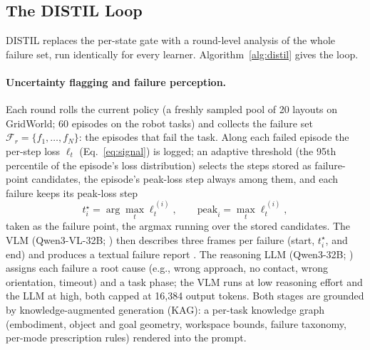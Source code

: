 \documentclass[letterpaper]{article} %
\begin{document}
\subsection{The DISTIL Loop}
\label{sec:distil}

DISTIL replaces the per-state gate with a round-level analysis of the whole
failure set, run identically for every learner.
Algorithm~\ref{alg:distil} gives the loop.

\paragraph{Uncertainty flagging and failure perception.}
Each round rolls the current policy (a freshly sampled pool of 20 layouts
on GridWorld; 60 episodes on the robot tasks) and collects the failure set
$\mathcal{F}_r=\{f_1,\dots,f_N\}$: the episodes that fail the task. Along
each failed episode the per-step loss $\ell_t$ (Eq.~\ref{eq:signal}) is
logged; an adaptive threshold (the 95th percentile of the episode's loss
distribution) selects the steps stored as failure-point candidates, the
episode's peak-loss step always among them, and each failure keeps its
peak-loss step
\begin{equation}
t^\star_i=\arg\max_t \ell^{\,(i)}_t,
\qquad
\mathrm{peak}_i=\max_t \ell^{\,(i)}_t,
\label{eq:flag}
\end{equation}
taken as the failure point, the argmax running over the stored candidates.
The
VLM (Qwen3-VL-32B; \citealp{bai2025qwen3vl}) then describes three frames per
failure (start, $t^\star_i$, and end) and produces a textual failure report
\citep{liu2023reflect,duan2025aha}. The reasoning LLM (Qwen3-32B;
\citealp{yang2025qwen3}) assigns each failure a root cause (e.g., wrong
approach, no contact, wrong orientation, timeout) and a task phase; the VLM
runs at low reasoning effort and the LLM at high, both capped at 16{,}384
output tokens. Both
stages are grounded by knowledge-augmented generation (KAG): a per-task
knowledge graph (embodiment, object and goal geometry, workspace bounds,
failure taxonomy, per-mode prescription rules) rendered into the prompt.
\end{document}
